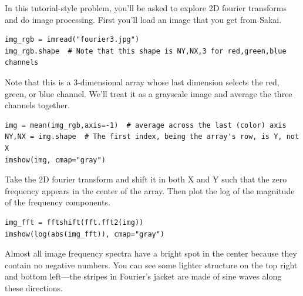 \documentclass[11pt]{hmcpset}
\begin{document}
\begin{problem}
	In this tutorial-style problem, you'll be asked to explore 2D fourier transforms and do image processing. First you'll load an image that you get from Sakai.
\begin{lstlisting}[style=Python]
img_rgb = imread("fourier3.jpg")
img_rgb.shape  # Note that this shape is NY,NX,3 for red,green,blue channels
\end{lstlisting}
Note that this is a 3-dimensional array whose last dimension selects the red, green, or blue channel. We'll treat it as a grayscale image and average the three channels together.
\begin{lstlisting}[style=Python]
img = mean(img_rgb,axis=-1)  # average across the last (color) axis
NY,NX = img.shape  # The first index, being the array's row, is Y, not X
imshow(img, cmap="gray")
\end{lstlisting}
Take the 2D fourier transform and shift it in both X and Y such that the zero frequency appears in the center of the array. Then plot the log of the magnitude of the frequency components.
\begin{lstlisting}[style=Python]
img_fft = fftshift(fft.fft2(img))
imshow(log(abs(img_fft)), cmap="gray")
\end{lstlisting}
Almost all image frequency spectra have a bright spot in the center because they contain no negative numbers. You can see some lighter structure on the top right and bottom left---the stripes in Fourier's jacket are made of sine waves along these directions.


\end{problem}
\end{document}

